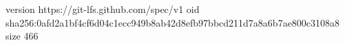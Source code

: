version https://git-lfs.github.com/spec/v1
oid sha256:0afd2a1bf4cf6d04c1ecc949b8ab42d8efb97bbcd211d7a8a6b7ae800c3108a8
size 466
